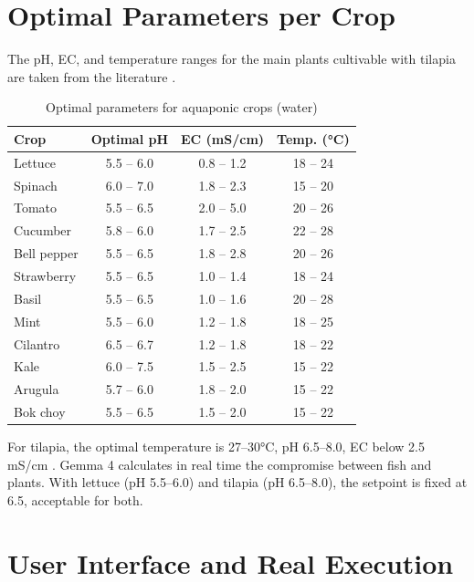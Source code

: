 \documentclass[12pt,a4paper]{article}
\begin{document}
\section{Optimal Parameters per Crop}

The pH, EC, and temperature ranges for the main plants cultivable with tilapia are taken from the literature \cite{carotti2023,control2020}.

\begin{table}[H]
\centering
\caption{Optimal parameters for aquaponic crops (water)}
\label{tab:params}
\begin{tabular}{@{}lccc@{}}
\toprule
\textbf{Crop} & \textbf{Optimal pH} & \textbf{EC (mS/cm)} & \textbf{Temp. (°C)} \\
\midrule
Lettuce          & 5.5 -- 6.0 & 0.8 -- 1.2 & 18 -- 24 \\
Spinach          & 6.0 -- 7.0 & 1.8 -- 2.3 & 15 -- 20 \\
Tomato           & 5.5 -- 6.5 & 2.0 -- 5.0 & 20 -- 26 \\
Cucumber         & 5.8 -- 6.0 & 1.7 -- 2.5 & 22 -- 28 \\
Bell pepper      & 5.5 -- 6.5 & 1.8 -- 2.8 & 20 -- 26 \\
Strawberry       & 5.5 -- 6.5 & 1.0 -- 1.4 & 18 -- 24 \\
Basil            & 5.5 -- 6.5 & 1.0 -- 1.6 & 20 -- 28 \\
Mint             & 5.5 -- 6.0 & 1.2 -- 1.8 & 18 -- 25 \\
Cilantro         & 6.5 -- 6.7 & 1.2 -- 1.8 & 18 -- 22 \\
Kale             & 6.0 -- 7.5 & 1.5 -- 2.5 & 15 -- 22 \\
Arugula          & 5.7 -- 6.0 & 1.8 -- 2.0 & 15 -- 22 \\
Bok choy         & 5.5 -- 6.5 & 1.5 -- 2.0 & 15 -- 22 \\
\bottomrule
\end{tabular}
\end{table}

For tilapia, the optimal temperature is 27--30°C, pH 6.5--8.0, EC below 2.5 mS/cm \cite{tolerance2020}. Gemma 4 calculates in real time the compromise between fish and plants. With lettuce (pH 5.5--6.0) and tilapia (pH 6.5--8.0), the setpoint is fixed at 6.5, acceptable for both.

\section{User Interface and Real Execution}
\end{document}
